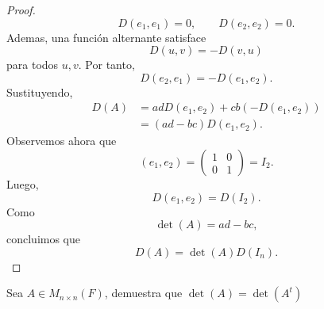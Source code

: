 \documentclass[12pt,a4paper]{article}
\begin{document}
\begin{proof}
\begin{equation*}
            D(e_{1},e_{1})=0,\qquad D(e_{2},e_{2})=0.
        \end{equation*}
        Ademas, una función alternante satisface
        \begin{equation*}
            D(u,v)=-D(v,u)
        \end{equation*}
        para todos $u,v$. Por tanto,
        \begin{equation*}
            D(e_{2},e_{1})=-D(e_{1},e_{2}).
        \end{equation*}
        Sustituyendo,
        \begin{align*}
            D(A)&=adD(e_{1},e_{2})+cb(-D(e_{1},e_{2}))\\
            &=(ad-bc)D(e_{1},e_{2}).
        \end{align*}
        Observemos ahora que
        \begin{equation*}
            (e_{1},e_{2})=
            \begin{pmatrix}
                1 & 0\\
                0 & 1
            \end{pmatrix}
            =I_{2}.
        \end{equation*}
        Luego,
        \begin{equation*}
            D(e_{1},e_{2})=D(I_{2}).
        \end{equation*}
        Como
        \begin{equation*}
            \det(A)=ad-bc,
        \end{equation*}
        concluimos que
        \begin{equation*}
            D(A)=\det(A)D(I_{n}).
        \end{equation*}
    \end{proof}

    \begin{mdframed}[style=mdpinkbox,frametitle={Ejercicio 3}]
        Sea $A\in M_{n\times n}(F)$, demuestra que $\det(A)=\det(A^{t})$
    \end{mdframed}
\end{document}

